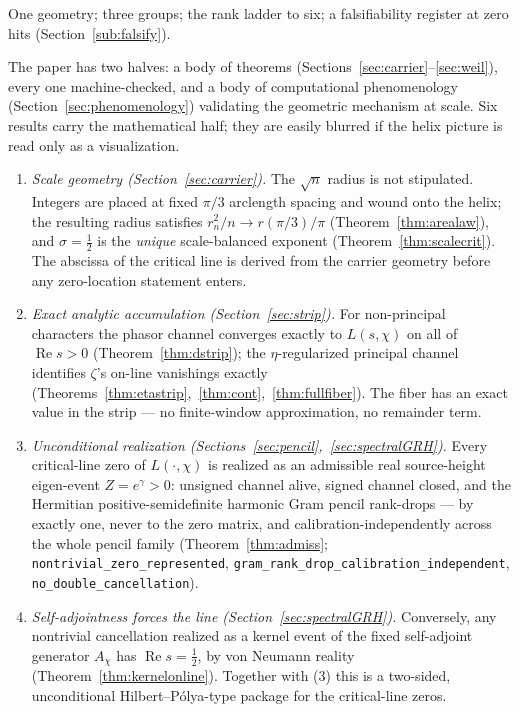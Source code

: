 \documentclass[11pt]{article}
\DeclareMathOperator{\Ree}{Re}
\newcommand{\code}[1]{\texttt{#1}}
\begin{document}
One geometry; three groups; the rank ladder to six; a falsifiability register at zero hits
(Section~\ref{sub:falsify}).

The paper has two halves: a body of theorems (Sections~\ref{sec:carrier}--\ref{sec:weil}), every one
machine-checked, and a body of computational phenomenology (Section~\ref{sec:phenomenology}) validating the geometric mechanism at scale.  Six
results carry the mathematical half; they are easily blurred if the helix picture is read only as a visualization.

\begin{enumerate}[label=\textup{(\arabic*)}]
\item \emph{Scale geometry (Section~\ref{sec:carrier}).}  The $\sqrt n$ radius is not stipulated.
Integers are placed at fixed $\pi/3$ arclength spacing and wound onto the helix; the resulting
radius satisfies $r_n^2/n\to r(\pi/3)/\pi$ (Theorem~\ref{thm:arealaw}), and $\sigma=\tfrac12$ is the
\emph{unique} scale-balanced exponent (Theorem~\ref{thm:scalecrit}).  The abscissa of the critical
line is derived from the carrier geometry before any zero-location statement enters.

\item \emph{Exact analytic accumulation (Section~\ref{sec:strip}).}  For non-principal characters
the phasor channel converges exactly to $L(s,\chi)$ on all of $\Ree s>0$
(Theorem~\ref{thm:dstrip}); the $\eta$-regularized principal channel identifies $\zeta$'s on-line
vanishings exactly (Theorems~\ref{thm:etastrip},~\ref{thm:cont},~\ref{thm:fullfiber}).  The fiber
has an exact value in the strip --- no finite-window approximation, no remainder term.

\item \emph{Unconditional realization (Sections~\ref{sec:pencil},~\ref{sec:spectralGRH}).}  Every
critical-line zero of $L(\cdot,\chi)$ is realized as an admissible real source-height eigen-event
$Z=e^{\gamma}>0$: unsigned channel alive, signed channel closed, and the Hermitian
positive-semidefinite harmonic Gram pencil rank-drops --- by exactly one, never to the zero matrix,
and calibration-independently across the whole pencil family
(Theorem~\ref{thm:admiss}; \code{nontrivial\_zero\_represented},
\code{gram\_rank\_drop\_calibration\_independent}, \code{no\_double\_cancellation}).

\item \emph{Self-adjointness forces the line (Section~\ref{sec:spectralGRH}).}  Conversely, any
nontrivial cancellation realized as a kernel event of the fixed self-adjoint generator $A_\chi$ has
$\Ree s=\tfrac12$, by von Neumann reality (Theorem~\ref{thm:kernelonline}).  Together with (3) this
is a two-sided, unconditional Hilbert--P\'olya-type package for the critical-line zeros.


\end{enumerate}
\end{document}
